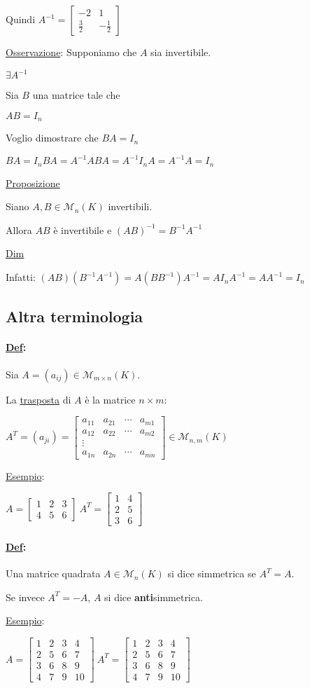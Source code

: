 \documentclass{article}
\newcommand{\ul}[1]{\underline{#1}}
\newcommand{\M}{\mathcal{M}}
\newcommand{\Def}[2]{\paragraph{\ul{Def}:}#1\\\hspace*{3em}\begin{minipage}{.8\textwidth}#2\end{minipage}}
\begin{document}
\begin{enumerate}
	  Quindi $A^{-1}=\begin{bmatrix}-2&1\\\frac{3}{2}&-\frac{1}{2}\end{bmatrix}$

	  \ul{Osservazione}: Supponiamo che $A$ sia invertibile.

	  $\exists A^{-1}$

	  Sia $B$ una matrice tale che

	  $AB=I_n$

	  Voglio dimostrare che $BA=I_n$

	  $BA=I_nBA=A^{-1}ABA=A^{-1}I_nA=A^{-1}A=I_n$
\end{enumerate}

\ul{Proposizione}

Siano $A,B\in\M_n(K)$ invertibili.

Allora $AB$ è invertibile e $(AB)^{-1}=B^{-1}A^{-1}$

\ul{Dim}

Infatti: $(AB)(B^{-1}A^{-1})=A(BB^{-1})A^{-1}=AI_nA^{-1}=AA^{-1}=I_n$

\subsection{Altra terminologia}
\Def{Sia $A=(a_{ij})\in\M_{m\times n}(K)$.}{
	La \ul{trasposta} di $A$ è la matrice $n\times m$:

	$A^T=(a_{ji})=\begin{bmatrix}
		a_{11} & a_{21} & \cdots & a_{m1} \\
		a_{12} & a_{22} & \cdots & a_{m2} \\
		\vdots                            \\
		a_{1n} & a_{2n} & \cdots & a_{mn}
	\end{bmatrix}\in\M_{n,m}(K)$

	\ul{Esempio}:

	$A=\begin{bmatrix}
		1 & 2 & 3 \\4&5&6
		\end{bmatrix}\ A^T=\begin{bmatrix}
		1 & 4 \\2&5\\3&6
	\end{bmatrix}$
}

\Def{Una matrice quadrata $A\in \M_n(K)$ si dice simmetrica se $A^T=A$.}{


	Se invece $A^T=-A$, $A$ si dice \textbf{anti}simmetrica.

	\ul{Esempio}:

	$A=\begin{bmatrix}
		1 & 2 & 3 & 4  \\
		2 & 5 & 6 & 7  \\
		3 & 6 & 8 & 9  \\
		4 & 7 & 9 & 10
		\end{bmatrix}\ A^T=\begin{bmatrix}
		1 & 2 & 3 & 4  \\
		2 & 5 & 6 & 7  \\
		3 & 6 & 8 & 9  \\
		4 & 7 & 9 & 10
	\end{bmatrix}$
}
\end{document}
